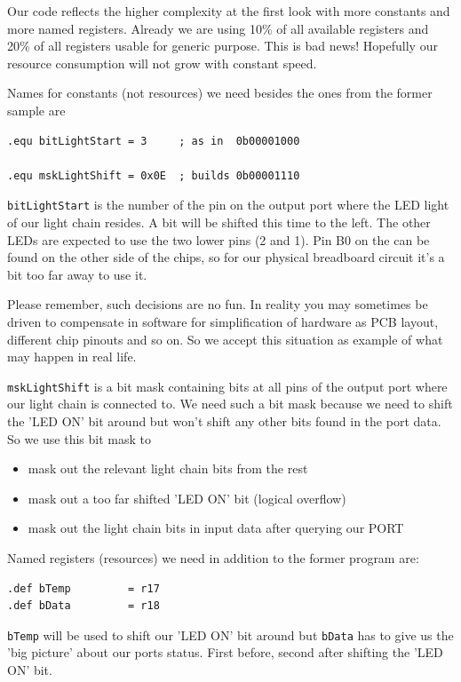 Our code reflects the higher complexity at the first look with more constants and more named registers. Already we are using 10\% of all available registers and 20\% of all registers usable for generic purpose. This is bad news! Hopefully our resource consumption will not grow with constant speed.

Names for constants (not resources) we need besides the ones from the former sample are

\begin{lstlisting}
.equ bitLightStart = 3     ; as in  0b00001000

.equ mskLightShift = 0x0E  ; builds 0b00001110
\end{lstlisting}

\texttt{bitLightStart} is the number of the pin on the output port where the LED light of our light chain resides. A bit will be shifted this time to the left. The other LEDs are expected to use the two lower pins (2 and 1). Pin B0 on the \at can be found on the other side of the chips, so for our physical breadboard circuit it's a bit too far away to use it.

Please remember, such decisions are no fun. In reality you may sometimes be driven to compensate in software for simplification of hardware as PCB layout, different chip pinouts and so on. So we accept this situation as example of what may happen in real life.

\texttt{mskLightShift} is a bit mask containing bits at all pins of the output port where our light chain is connected to. We need such a bit mask because we need to shift the 'LED ON' bit around but won't shift any other bits found in the port data. So we use this bit mask to

\begin{itemize}
  \item mask out the relevant light chain bits from the rest
  \item mask out a too far shifted 'LED ON' bit (logical overflow)
  \item mask out the light chain bits in input data after querying our PORT
\end{itemize}


Named registers (resources) we need in addition to the former program are:
 
\begin{lstlisting}
.def bTemp         = r17
.def bData         = r18
\end{lstlisting}

\texttt{bTemp} will be used to shift our 'LED ON' bit around but \texttt{bData} has to give us the 'big picture' about our ports status. First before, second after shifting the 'LED ON' bit.

